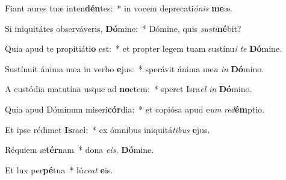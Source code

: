 \item Fiant aures tuæ inten\textbf{dén}tes:~* in vocem deprecati\teenyhspace\textit{ónis} \textbf{me}æ.
\item Si iniquitátes observáveris, \textbf{Dó}mine:~* Dómine, quis \textit{susti}\hspace{-0.01em}\textbf{né}bit?
\item Quia apud te propitiáti\textbf{o} est:~* et propter legem tuam sustínu\tinyhspace\textit{i} \textit{te} \textbf{Dó}mine.
\item Sustínuit ánima mea in verbo \textbf{e}jus:~* sperávit ánima me\tinyhspace\textit{a} \textit{in} \textbf{Dó}mino.
\item A custódia matutína usque ad \textbf{no}ctem:~* speret Isra\tinyhspace\textit{el} \textit{in} \textbf{Dó}mino.
\item Quia apud Dóminum miseri\textbf{cór}dia:~* et copiósa apud e\tinyhspace\textit{um} \textit{red}\textbf{ém}ptio.
\item Et ipse rédimet \textbf{Is}rael:~* ex ómnibus iniquitá\tinyhspace\textit{tibus} \textbf{e}jus.
\item Réquiem æ\textbf{tér}nam~* dona \textit{e}\textit{is,} \textbf{Dó}mine.
\item Et lux per\textbf{pé}tua~* lú\tinyhspace\textit{ce}\textit{at} \textbf{e}is.